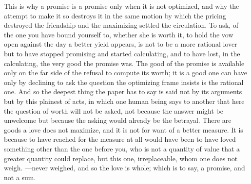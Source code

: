 This is why a promise is a promise only when it is not optimized, and why the attempt to make it so destroys it in the same motion by which the pricing destroyed the friendship and the maximizing settled the circulation. To ask, of the one you have bound yourself to, whether she is worth it, to hold the vow open against the day a better yield appears, is not to be a more rational lover but to have stopped promising and started calculating, and to have lost, in the calculating, the very good the promise was. The good of the promise is available only on the far side of the refusal to compute its worth; it is a good one can have only by declining to ask the question the optimizing frame insists is the rational one. And so the deepest thing the paper has to say is said not by its arguments but by this plainest of acts, in which one human being says to another that here the question of worth will not be asked, not because the answer might be unwelcome but because the asking would already be the betrayal. There are goods a love does not maximize, and it is not for want of a better measure. It is because to have reached for the measure at all would have been to have loved something other than the one before you, who is not a quantity of value that a greater quantity could replace, but this one, irreplaceable, whom one does not weigh. ---never weighed, and so the love is whole; which is to say, a promise, and not a sum.
